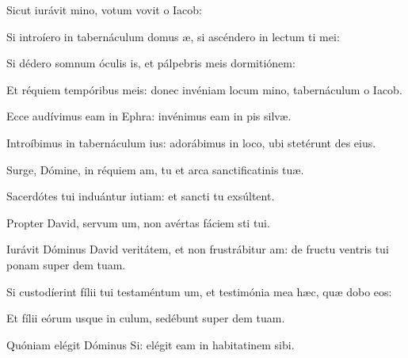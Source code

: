\item {}

\item Sicut iurávit mino,\psstar{} votum vovit o Iacob:

\item Si introíero in tabernáculum domus æ,\psstar{} si ascéndero in lectum ti mei:

\item Si dédero somnum óculis is,\psstar{} et pálpebris meis dormitiónem:

\item Et réquiem tempóribus meis: donec invéniam locum mino,\psstar{} tabernáculum o Iacob.

\item Ecce audívimus eam in Ephra:\psstar{} invénimus eam in pis silvæ.

\item Introíbimus in tabernáculum ius:\psstar{} adorábimus in loco, ubi stetérunt des eius.

\item Surge, Dómine, in réquiem am,\psstar{} tu et arca sanctificatinis tuæ.

\item Sacerdótes tui induántur iutiam:\psstar{} et sancti tu exsúltent.

\item Propter David, servum um,\psstar{} non avértas fáciem sti tui.

\item Iurávit Dóminus David veritátem, et non frustrábitur am:\psstar{} de fructu ventris tui ponam super dem tuam.

\item Si custodíerint fílii tui testaméntum um,\psstar{} et testimónia mea hæc, quæ dobo eos:

\item Et fílii eórum usque in culum,\psstar{} sedébunt super dem tuam.

\item Quóniam elégit Dóminus Si:\psstar{} elégit eam in habitatinem sibi.

